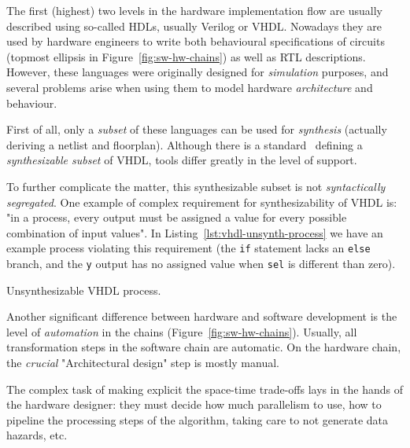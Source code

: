         The first (highest) two levels in the hardware implementation flow are usually described using
        so-called \acp{HDL}, usually Verilog or \acs{VHDL}.
        Nowadays they are used by hardware engineers to write both behavioural specifications of circuits
        (topmost ellipsis in Figure~\ref{fig:sw-hw-chains}) as well as \ac{RTL} descriptions.
        However, these languages were originally designed for \emph{simulation} purposes,
        and several problems arise when using them to model hardware \emph{architecture} and behaviour.

        First of all, only a \emph{subset} of these languages can be used for \emph{synthesis}
        (actually deriving a netlist and floorplan).
        Although there is a standard~\cite{ieee1076-3-synth-vhdl} defining a \emph{synthesizable subset} of \acs{VHDL},
        tools differ greatly in the level of support.

        To further complicate the matter, this synthesizable subset is not \emph{syntactically segregated}.
        One example of complex requirement for synthesizability of \acs{VHDL} is:
        "in a process, every output must be assigned a value for every possible combination of input values".
        In Listing~\ref{lst:vhdl-unsynth-process} we have an example process violating this requirement
        (the \texttt{if} statement lacks an \texttt{else} branch, and the \texttt{y} output has no assigned
        value when \texttt{sel} is different than zero).

        \begin{listing}[h]
            \caption{Unsynthesizable \acs{VHDL} process.\label{lst:vhdl-unsynth-process}}
        \end{listing}

        Another significant difference between hardware and software development
        is the level of \emph{automation} in the chains (Figure~\ref{fig:sw-hw-chains}).
        Usually, all transformation steps in the software chain are automatic.
        On the hardware chain, the \emph{crucial} "Architectural design" step is mostly manual.

        The complex task of making explicit the space-time trade-offs lays in the hands of the hardware designer:
        they must decide how much parallelism to use, how to pipeline the processing steps of the algorithm,
        taking care to not generate data hazards, etc.

